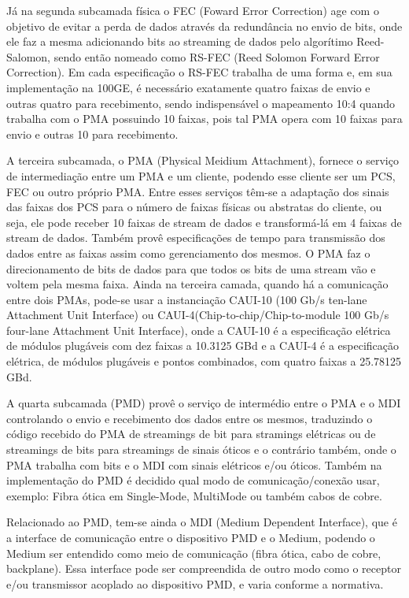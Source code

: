 \documentclass[a4paper,12pt]{article}
\begin{document}
Já na segunda subcamada física o FEC (Foward Error Correction) age com o objetivo de evitar a perda de dados através da redundância no envio de bits, onde ele faz a mesma adicionando bits ao streaming de dados pelo algorítimo Reed-Salomon, sendo então nomeado como RS-FEC (Reed Solomon Forward Error Correction). Em cada especificação o RS-FEC trabalha de uma forma e, em sua implementação na 100GE, é necessário exatamente quatro faixas de envio e outras quatro para recebimento, sendo indispensável o mapeamento 10:4 quando trabalha com o PMA possuindo 10 faixas, pois tal PMA opera com 10 faixas para envio e outras 10 para recebimento.

A terceira subcamada, o PMA (Physical Meidium Attachment), fornece o serviço de intermediação entre um PMA e um cliente, podendo esse cliente ser um PCS, FEC ou outro próprio PMA. Entre esses serviços têm-se a adaptação dos sinais das faixas dos PCS para o número de faixas físicas ou abstratas do cliente, ou seja, ele pode receber 10 faixas de stream de dados e transformá-lá em 4 faixas de stream de dados. Também provê especificações de tempo para transmissão dos dados entre as faixas assim como gerenciamento dos mesmos. O PMA faz o direcionamento de bits de dados para que todos os bits de uma stream vão e voltem pela mesma faixa. Ainda na terceira camada, quando há a comunicação entre dois PMAs, pode-se usar a instanciação CAUI-10 (100 Gb/s ten-lane Attachment Unit Interface) ou CAUI-4(Chip-to-chip/Chip-to-module 100 Gb/s four-lane Attachment Unit Interface), onde a CAUI-10 é a especificação elétrica de módulos plugáveis com dez faixas a 10.3125 GBd e a CAUI-4 é a especificação elétrica, de módulos plugáveis e pontos combinados, com quatro faixas a 25.78125 GBd.



A quarta subcamada (PMD) provê o serviço de intermédio entre o PMA e o MDI controlando o envio e recebimento dos dados entre os mesmos, traduzindo o código recebido do PMA de streamings de bit para stramings elétricas ou de streamings de bits para streamings de sinais óticos e o contrário também, onde o PMA trabalha com bits e o MDI com sinais elétricos e/ou óticos. Também na implementação do PMD é decidido qual modo de comunicação/conexão usar, exemplo: Fibra ótica em Single-Mode, MultiMode ou também cabos de cobre.

Relacionado ao PMD, tem-se ainda o MDI (Medium Dependent Interface), que é a interface de comunicação entre o dispositivo PMD e o Medium, podendo o Medium ser entendido como meio de comunicação (fibra ótica, cabo de cobre, backplane). Essa interface pode ser compreendida de outro modo como o receptor e/ou transmissor acoplado ao dispositivo PMD, e varia conforme a normativa.
\end{document}
